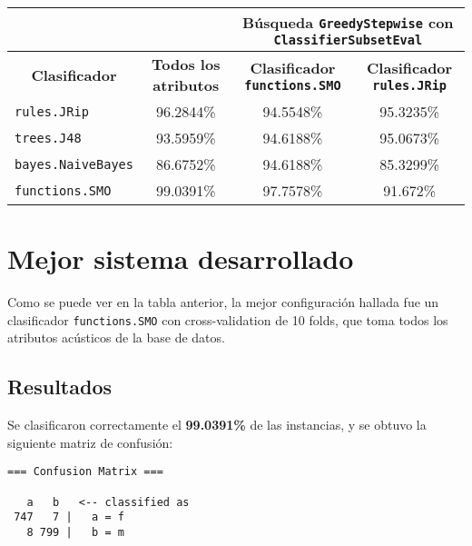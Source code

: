 \documentclass[10pt,a4paper]{article}
\begin{document}
\begin{table}
  \centering
  \begin{tabular}{  l  c | c | c | }
    \cline{3-4}
    & & \multicolumn{2}{|c|}{\textbf{Búsqueda \texttt{GreedyStepwise} con \texttt{ClassifierSubsetEval}}}  \\
    \hline                        
    \multicolumn{1}{|c|}{\textbf{Clasificador}} & \textbf{Todos los atributos} & \textbf{Clasificador \texttt{functions.SMO}} & \textbf{Clasificador \texttt{rules.JRip}} \\
    \hline
    \multicolumn{1}{|l|}{\texttt{rules.JRip}}       & 96.2844\% & 94.5548\% & 95.3235\% \\
    \hline
    \multicolumn{1}{|l|}{\texttt{trees.J48}}        & 93.5959\% & 94.6188\% & 95.0673\% \\
    \hline
    \multicolumn{1}{|l|}{\texttt{bayes.NaiveBayes}} & 86.6752\% & 94.6188\% & 85.3299\% \\
    \hline
    \multicolumn{1}{|l|}{\texttt{functions.SMO}}    & 99.0391\% & 97.7578\% & 91.672\% \\
    \hline  
  \end{tabular}
\end{table}

\section{Mejor sistema desarrollado}

Como se puede ver en la tabla anterior, la mejor configuración hallada fue un clasificador \texttt{functions.SMO} con cross-validation de 10 folds, que toma todos los atributos acústicos de la base de datos.

\subsection{Resultados}

Se clasificaron correctamente el \textbf{99.0391\%} de las instancias, y se obtuvo la siguiente matriz de confusión:

\begin{verbatim}
=== Confusion Matrix ===

   a   b   <-- classified as
 747   7 |   a = f
   8 799 |   b = m
\end{verbatim}
\end{document}
